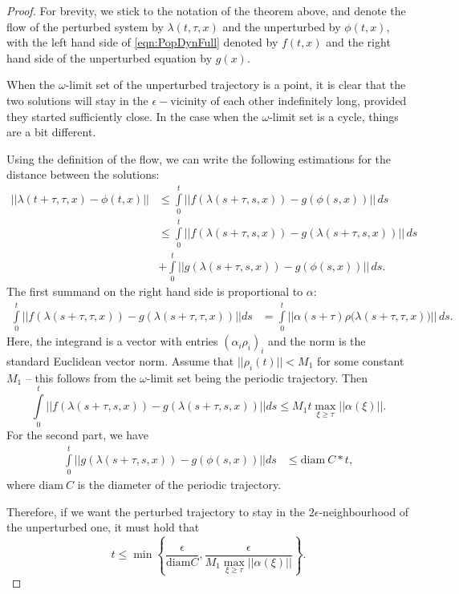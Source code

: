 \documentclass{article}
\begin{document}
\begin{proof}
For brevity, we stick to the notation of the theorem above, and denote the flow of the perturbed system by $\lambda(t,\tau,x)$ and the unperturbed by $\phi(t,x)$, with the left hand side of \eqref{eqn:PopDynFull} denoted by $f(t,x)$ and the right hand side of the unperturbed equation by $g(x)$.

When the $\omega$-limit set of the unperturbed trajectory is a point, it is clear that the two solutions will stay in the $\epsilon-$vicinity of each other indefinitely long, provided they started sufficiently close. In the case when the $\omega$-limit set is a cycle, things are a bit different. 

Using the definition of the flow, we can write the following estimations for the distance between the solutions:
\begin{equation*}
    \begin{split}
        ||\lambda(t + \tau, \tau,x) - \phi(t,x)||&\le \int\limits_0^t ||f(\lambda(s + \tau,s,x)) -g(\phi(s,x))||\,d s\\&\le\int\limits_0^t ||f(\lambda(s + \tau,s,x)) -g(\lambda(s + \tau,s,x))||\,d s \\&+ \int\limits_0^t ||g(\lambda(s + \tau,s,x)) -g(\phi(s,x))||\, d s.
    \end{split}
\end{equation*}
The first summand on the right hand side is proportional to $\alpha:$
\begin{equation*}
    \begin{split}
       \int\limits_0^t ||f(\lambda(s + \tau,\tau,x)) -g(\lambda(s + \tau,\tau,x))||d s & = \int\limits_0^t||\alpha(s + \tau)\rho(\lambda(s + \tau,\tau,x){)} ||\, d s.
    \end{split}
\end{equation*}
Here, the integrand is a vector with entries $(\alpha_i {\rho}_i)_i$ and the norm is the standard Euclidean vector norm.  Assume that $||{\rho}_i(t)||<M_1$ for some constant $M_1$ -- this follows from the $\omega$-limit set being the periodic trajectory. Then 
\[
\int\limits_0^t ||f(\lambda(s + \tau,s,x)) -g(\lambda(s + \tau,s,x))||d s \le M_1 t \max_{\xi\ge \tau}||\alpha(\xi)||. 
\]
For the second part, we have 
\begin{equation*}
    \begin{split}
       \int\limits_0^t ||g(\lambda(s + \tau,s,x)) -g(\phi(s,x))||d s&\le \mathrm{diam}\ C*t ,
    \end{split}
\end{equation*}
where $\mathrm{diam}\ C$ is the diameter of the periodic trajectory. 

Therefore, if we want the perturbed trajectory to stay in the $2\epsilon$-neighbourhood of the unperturbed one, it must hold that 
\[
t\le \min\left\{\frac{\epsilon}{\mathrm{diam} C}, \frac{\epsilon}{M_1\max_{\xi\ge\tau}||\alpha(\xi)||}\right\}.
\]
\end{proof}
\end{document}

